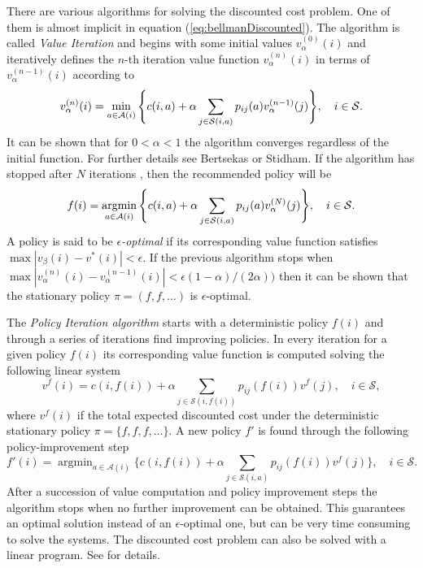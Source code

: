\documentclass[11pt]{article}
\newcommand {\cA}{\ensuremath \mathcal{A}}
\newcommand {\cS}{\ensuremath \mathcal{S}}
\DeclareMathOperator*{\argmin}{argmin}
\begin{document}
There are various algorithms for solving the discounted cost problem. One of them is almost implicit in equation (\ref{eq:bellmanDiscounted}). The algorithm is called \emph{Value Iteration}  and begins with some initial values $v_{\alpha}^{(0)}(i)$ and iteratively defines the $n$-th iteration value function $v_{\alpha}^{(n)}(i)$ in terms of $v_{\alpha}^{(n-1)}(i)$ according to
\[  v_{\alpha}^{(n)}(i) = \min_{a \in \cA(i)} \Bigg \{ c(i,a) + \alpha\sum_{j \in \mathcal{S}(i,a)} p_{ij}(a)v_{\alpha}^{(n-1)}(j) \Bigg \} ,\quad i \in \mathcal{S}.
\]
It can be shown that for $0<\alpha<1$ the algorithm converges regardless of the initial function. For further details see Bertsekas\cite{bertsekas} or Stidham\cite{stidham}. If the algorithm has stopped after $N$ iterations , then the recommended policy will be
\[f(i) = \argmin_{a \in \mathcal{A}(i)} \Bigg \{ c(i,a) + \alpha\sum_{j \in \mathcal{S}(i,a)} p_{ij}(a)v_{\alpha}^{(N)}(j) \Bigg \} ,\quad i \in \cS.\]
A policy is said to be \emph{$\epsilon$-optimal} if its corresponding value function satisfies $\max|v_\beta(i)-v^*(i)|<\epsilon$. If the previous algorithm stops when $\max|v_\alpha^{(n)}( i ) - v_\alpha^{ (n-1) }(i)|<\epsilon(1-\alpha)/(2\alpha))$ then it can be shown that the stationary policy $\pi=(f,f,\ldots)$ is $\epsilon$-optimal.

The \emph{Policy Iteration algorithm}  starts with a deterministic policy $f(i)$ and through a series of iterations find improving policies. In every iteration for a given policy $f(i)$ its corresponding value function  is computed solving the following linear system
\begin{equation}\label{eq:lin_system}
 v^f(i) = c(i,f(i)) + \alpha\sum_{j \in \mathcal{S}(i,f(i))} p_{ij}(f(i))v^{f}(j) ,\quad i \in \mathcal{S},
\end{equation}
where $v^f (i)$ if the total expected discounted cost under the deterministic stationary policy $\pi=\{f, f, f, \ldots\}$. A new policy $f'$ is found through the following policy-improvement step
\[f'(i) = \argmin_{a \in \mathcal{A}(i)} \Bigg \{ c(i,f(i)) + \alpha\sum_{j \in \mathcal{S}(i,a)} p_{ij}(f(i))v^f(j) \Bigg \} ,\quad i \in \mathcal{S}.\]
After a succession of value computation and policy improvement steps the algorithm stops when no further improvement can be obtained.
This guarantees an optimal solution instead of an $\epsilon$-optimal one, but can be very time consuming to solve the systems.
The discounted cost problem can also be solved with a linear program. See \cite{stidham} for details.
\end{document}
